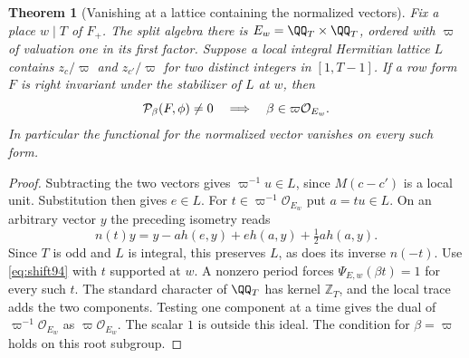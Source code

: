 \documentclass[a4paper,11pt]{article}
\newtheorem{theorem}[proposition]{Theorem}
\theoremstyle{definition}
\theoremstyle{remark}
\newcommand{\ZZ}{\mathbb Z}\newcommand{\ord}{\operatorname{ord}}
\numberwithin{equation}{section}
\newcommand{\OO}{\mathcal O}
\begin{document}
\begin{theorem}[Vanishing at a lattice containing the normalized vectors]
\label{thm:van94}
Fix a place \(w\mid T\) of \(F_+\). The split algebra there is
\(E_w=\QQ_T\times\QQ_T\), ordered with \(\varpi\) of valuation one
in its first factor. Suppose a local integral Hermitian lattice \(L\)
contains \(z_c/\varpi\) and \(z_{c'}/\varpi\) for two distinct
integers in \([1,T-1]\). If a row form \(F\) is right invariant
under the stabilizer of \(L\) at \(w\), then
\[
             {\cal P}_\beta(F,\phi)\ne0
       \quad\Longrightarrow\quad \beta\in\varpi\OO_{E_w}.
\]
In particular the functional for the normalized vector vanishes on
every such form.
\end{theorem}
\begin{proof}
Subtracting the two vectors gives \(\varpi^{-1}u\in L\), since
\(M(c-c')\) is a local unit. Substitution then gives \(e\in L\).
For \(t\in\varpi^{-1}\OO_{E_w}\) put \(a=tu\in L\). On an arbitrary
vector \(y\) the preceding isometry reads
\[
 n(t)y=y-a h(e,y)+e h(a,y)+\tfrac12 a h(a,y).
\]
Since \(T\) is odd and \(L\) is integral, this preserves \(L\),
as does its inverse \(n(-t)\). Use \eqref{eq:shift94} with \(t\)
supported at \(w\). A nonzero period forces \(\Psi_{E,w}(\beta t)=1\)
for every such \(t\). The standard character of \(\QQ_T\) has
kernel \(\ZZ_T\), and the local trace adds the two components.
Testing one component at a time gives the dual of
\(\varpi^{-1}\OO_{E_w}\) as \(\varpi\OO_{E_w}\). The scalar \(1\)
is outside this ideal. The condition for \(\beta=\varpi\) holds on
this root subgroup.
\end{proof}
\end{document}
